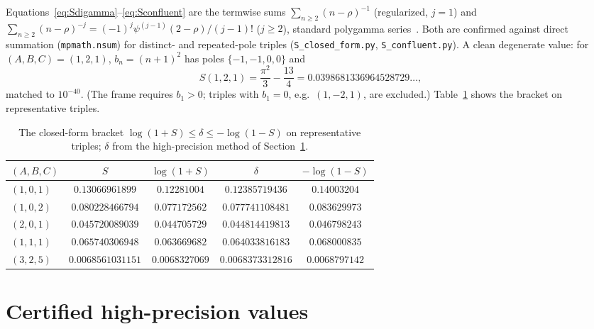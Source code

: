 \documentclass[11pt]{article}
\begin{document}
Equations~\eqref{eq:Sdigamma}--\eqref{eq:Sconfluent} are the termwise sums
$\sum_{n\ge2}(n-\rho)^{-1}$ (regularized, $j=1$) and
$\sum_{n\ge2}(n-\rho)^{-j}=(-1)^j\psi^{(j-1)}(2-\rho)/(j-1)!$ ($j\ge2$), standard
polygamma series~\cite[\S5.15]{dlmf}. Both are confirmed against direct summation
(\texttt{mpmath.nsum}) for distinct- and repeated-pole triples
(\texttt{S\_closed\_form.py}, \texttt{S\_confluent.py}). A clean degenerate value:
for $(A,B,C)=(1,2,1)$, $b_n=(n+1)^2$ has poles $\{-1,-1,0,0\}$ and
\begin{equation}\label{eq:S121}
  S(1,2,1)=\frac{\pi^2}{3}-\frac{13}{4}=0.0398681336964528729\ldots,
\end{equation}
matched to $10^{-40}$. (The frame requires $b_1>0$; triples with $b_1=0$, e.g.\
$(1,-2,1)$, are excluded.) Table~\ref{tab:bracket} shows the bracket on
representative triples.

\begin{table}[t]
\centering
\caption{The closed-form bracket $\log(1+S)\le\delta\le-\log(1-S)$ on
representative triples; $\delta$ from the high-precision method of
Section~\ref{sec:hp}.}\label{tab:bracket}
\begin{tabular}{lcccc}
\toprule
$(A,B,C)$ & $S$ & $\log(1+S)$ & $\delta$ & $-\log(1-S)$\\
\midrule
$(1,0,1)$ & $0.13066961899$ & $0.12281004$ & $0.12385719436$ & $0.14003204$\\
$(1,0,2)$ & $0.080228466794$ & $0.077172562$ & $0.077741108481$ & $0.083629973$\\
$(2,0,1)$ & $0.045720089039$ & $0.044705729$ & $0.044814419813$ & $0.046798243$\\
$(1,1,1)$ & $0.065740306948$ & $0.063669682$ & $0.064033816183$ & $0.068000835$\\
$(3,2,5)$ & $0.0068561031151$ & $0.0068327069$ & $0.0068373312816$ & $0.0068797142$\\
\bottomrule
\end{tabular}
\end{table}

\section{Certified high-precision values}\label{sec:hp}
\end{document}
